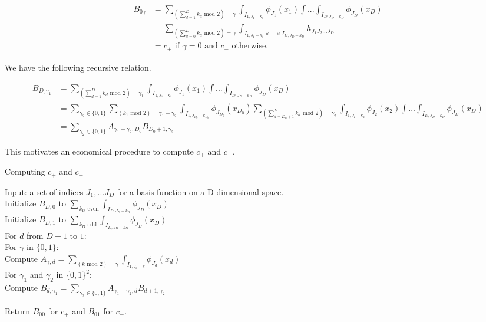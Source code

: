 \documentclass{article}
\begin{document}
\begin{align*}
B_{0\gamma}&=\sum_{\left(\sum_{d=1}^D k_d \text{ mod } 2\right) = \gamma} \int_{I_{1,J_1-k_1}}\phi_{J_1}(x_1)\int ... \int_{I_{D,J_D-k_D}}  \phi_{J_D}(x_D) \\ 
&=\sum_{\left(\sum_{d={0}}^D k_d \text{ mod } 2\right) = \gamma} \int_{I_{1,J_1-k_1}\times ... \times I_{D,J_D-k_D}}  h_{J_1 J_2 ... J_D} \\
&= c_+ \text{ if } \gamma=0 \text{ and } c_- \text{ otherwise. }
\end{align*}

We have the following recursive relation.

\begin{align*}
B_{D_0\gamma_1}&=\sum_{\left(\sum_{d=1}^D k_d \text{ mod } 2\right) = \gamma_1} \int_{I_{1,J_1-k_1}}\phi_{J_1}(x_1)\int ... \int_{I_{D,J_D-k_D}}  \phi_{J_D}(x_D) \\
&=\sum_{ \gamma_2 \in \{0,1\}} \sum_{\left(k_1 \text{ mod } 2\right) = \gamma_1 - \gamma_2} \int_{I_{1,J_{D_0}-k_{D_0}}}\phi_{J_{D_0}}(x_{D_0})
\sum_{\left(\sum_{d={D_0+1}}^D k_d \text{ mod } 2\right) = \gamma_2} \int_{I_{1,J_2-k_2}}\phi_{J_2}(x_2)\int ... \int_{I_{D,J_D-k_D}}  \phi_{J_D}(x_D) \\
&=\sum_{ \gamma_2 \in \{0,1\}}  A_{ \gamma_1 - \gamma_2, {D_0}}
B_{{D_0}+1,\gamma_2}
\end{align*}

This motivates an economical procedure to compute $c_+$ and $c_-$. 
\begin{algorithm}[h]
\caption{Computing $c_+$ and $c_-$}
Input: a set of indices $J_1, ... J_D$ for a basis function on a D-dimensional space.\\
Initialize $B_{D,0}$ to $\sum_{k_D \text{ even}} \int_{I_{D,J_D-k_D}}  \phi_{J_D}(x_D)$\\
Initialize $B_{D,1}$ to $\sum_{k_D \text{ odd}} \int_{I_{D,J_D-k_D}}  \phi_{J_D}(x_D)$\\
For $d$ from $D-1$ to $1$:\\
\Indp
For $\gamma$ in $\{0,1\}$:\\
\Indp
Compute $A_{\gamma, d} = \sum_{\left(k \text{ mod } 2\right) = \gamma} \int_{I_{1,J_d-k}}\phi_{J_d}(x_d)$\\
\Indm
For $\gamma_1$ and $\gamma_2$ in $\{0,1\}^2$:\\
\Indp
Compute $B_{d,\gamma_1} =\sum_{ \gamma_2 \in \{0,1\}}  A_{ \gamma_1 - \gamma_2, {d}}
B_{{d}+1,\gamma_2}$\\
\Indm
\Indm

Return $B_{00}$ for $c_+$ and $B_{01}$ for $c_-$. 
\Indp
\Indm
\end{algorithm}
\end{document}
